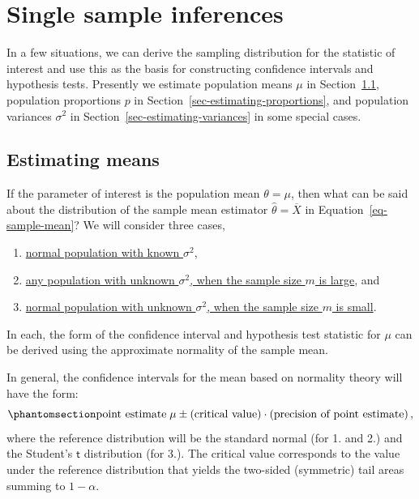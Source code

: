 \documentclass[
  a4paper,
  DIV=11,
  numbers=noendperiod,
  oneside]{scrreprt}
\providecommand{\tightlist}{%
  \setlength{\itemsep}{0pt}\setlength{\parskip}{0pt}}
\theoremstyle{definition}
\theoremstyle{definition}
\theoremstyle{plain}
\theoremstyle{plain}
\theoremstyle{definition}
\theoremstyle{remark}
\begin{document}
\chapter{Single sample inferences}\label{sec-inference-single-sample}

In a few situations, we can derive the sampling distribution for the
statistic of interest and use this as the basis for constructing
confidence intervals and hypothesis tests. Presently we estimate
population means \(\mu\) in Section~\ref{sec-estimating-means},
population proportions \(p\) in
Section~\ref{sec-estimating-proportions}, and population variances
\(\sigma^2\) in Section~\ref{sec-estimating-variances} in some special
cases.

\section{Estimating means}\label{sec-estimating-means}

If the parameter of interest is the population mean \(\theta = \mu\),
then what can be said about the distribution of the sample mean
estimator \(\widehat{\theta} = \overline{X}\) in
Equation~\ref{eq-sample-mean}? We will consider three cases,

\begin{enumerate}
\def\labelenumi{\arabic{enumi}.}
\tightlist
\item
  \hyperref[sec-mean-normal-var-known]{normal population with known
  \(\sigma^2\)},
\item
  \hyperref[sec-mean-large-sample]{any population with unknown
  \(\sigma^2\), when the sample size \(m\) is large}, and
\item
  \hyperref[sec-mean-normal-var-unknown]{normal population with unknown
  \(\sigma^2\), when the sample size \(m\) is small}.
\end{enumerate}

In each, the form of the confidence interval and hypothesis test
statistic for \(\mu\) can be derived using the approximate normality of
the sample mean.

In general, the confidence intervals for the mean based on normality
theory will have the form:
\begin{equation}\phantomsection\label{eq-ci-gen-form}{
 \text{point estimate}\; \mu \pm (\text{critical value}) \cdot (\text{precision of point estimate})\,, 
}\end{equation} where the reference distribution will be the standard
normal (for 1. and 2.) and the Student's \(\mathsf{t}\) distribution
(for 3.). The critical value corresponds to the value under the
reference distribution that yields the two-sided (symmetric) tail areas
summing to \(1-\alpha.\)
\end{document}
